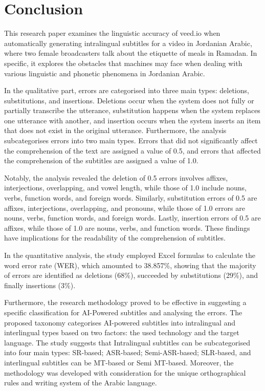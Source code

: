 \documentclass[english]{textolivre}
\begin{document}
\section{Conclusion}\label{sec-conclusion}

This research paper examines the linguistic accuracy of veed.io when
automatically generating intralingual subtitles for a video in Jordanian
Arabic, where two female broadcasters talk about the etiquette of meals
in Ramadan. In specific, it explores the obstacles that machines may
face when dealing with various linguistic and phonetic phenomena in
Jordanian Arabic.

In the qualitative part, errors are categorised into three main types:
deletions, substitutions, and insertions. Deletions occur when the
system does not fully or partially transcribe the utterance,
substitution happens when the system replaces one utterance with
another, and insertion occurs when the system inserts an item that does
not exist in the original utterance. Furthermore, the analysis
subcategorises errors into two main types. Errors that did not
significantly affect the comprehension of the text are assigned a value
of 0.5, and errors that affected the comprehension of the subtitles are
assigned a value of 1.0.

Notably, the analysis revealed the deletion of 0.5 errors involves
affixes, interjections, overlapping, and vowel length, while those of
1.0 include nouns, verbs, function words, and foreign words. Similarly,
substitution errors of 0.5 are affixes, interjections, overlapping, and
pronouns, while those of 1.0 errors are nouns, verbs, function words,
and foreign words. Lastly, insertion errors of 0.5 are affixes, while
those of 1.0 are nouns, verbs, and function words. These findings have
implications for the readability of the comprehension of subtitles.

In the quantitative analysis, the study employed Excel formulas to
calculate the word error rate (WER), which amounted to 38.857\%, showing
that the majority of errors are identified as deletions (68\%),
succeeded by substitutions (29\%), and finally insertions (3\%).

Furthermore, the research methodology proved to be effective in
suggesting a specific classification for AI-Powered subtitles and
analysing the errors. The proposed taxonomy categorises AI-powered
subtitles into intralingual and interlingual types based on two factors:
the used technology and the target language. The study suggests that
Intralingual subtitles can be subcategorised into four main types:
SR-based; ASR-based; Semi-ASR-based; SLR-based, and interlingual
subtitles can be MT-based or Semi MT-based. Moreover, the methodology
was developed with consideration for the unique orthographical rules and
writing system of the Arabic language.
\end{document}
